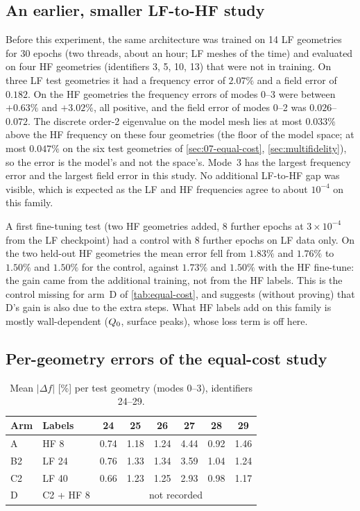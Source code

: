 \subsection{An earlier, smaller LF-to-HF study}\label{sec:A07-first}
Before this experiment, the same architecture was trained on 14 LF geometries for 30 epochs (two threads, about an hour; LF meshes of the time) and evaluated on four HF geometries (identifiers 3, 5, 10, 13) that were not in training.
On three LF test geometries it had a frequency error of $2.07\%$ and a field error of $0.182$. On the HF geometries the frequency errors of modes 0--3 were between $+0.63\%$ and $+3.02\%$, all positive, and the field error of modes 0--2 was $0.026$--$0.072$.
The discrete order-2 eigenvalue on the model mesh lies at most $0.033\%$ above the HF frequency on these four geometries (the floor of the model space; at most $0.047\%$ on the six test geometries of \cref{sec:07-equal-cost}, \cref{sec:multifidelity}), so the error is the model's and not the space's. Mode~3 has the largest frequency error and the largest field error in this study. No additional LF-to-HF gap was visible, which is expected as the LF and HF frequencies agree to about $10^{-4}$ on this family.

A first fine-tuning test (two HF geometries added, 8 further epochs at $3\times10^{-4}$ from the LF checkpoint) had a control with 8 further epochs on LF data only. On the two held-out HF geometries the mean error fell from $1.83\%$ and $1.76\%$ to
$1.50\%$ and $1.50\%$ for the control, against $1.73\%$ and $1.50\%$ with the HF fine-tune: the gain came from the additional training, not from the HF labels.
This is the control missing for arm~D of \cref{tab:equal-cost}, and suggests (without proving) that D's gain is also due to the extra steps. What HF labels add on this family is mostly wall-dependent ($\Qz$, surface peaks), whose loss term is off here.

\subsection{Per-geometry errors of the equal-cost study}\label{sec:A07-pergeom}
\begin{table}[t]
\centering\small
\caption{Mean $|\Delta f|$ [\%] per test geometry (modes 0--3), identifiers 24--29.}
\label{tab:A07-pergeom}
\begin{tabular}{llcccccc}
\toprule
Arm & Labels & 24 & 25 & 26 & 27 & 28 & 29\\
\midrule
A  & HF 8 & 0.74 & 1.18 & 1.24 & 4.44 & 0.92 & 1.46\\
B2 & LF 24 & 0.76 & 1.33 & 1.34 & 3.59 & 1.04 & 1.24\\
C2 & LF 40 & 0.66 & 1.23 & 1.25 & 2.93 & 0.98 & 1.17\\
D  & C2 + HF 8 & \multicolumn{6}{c}{not recorded}\\
\bottomrule
\end{tabular}
\end{table}

